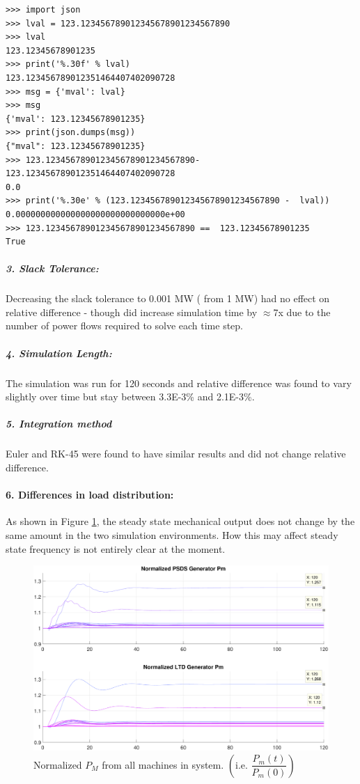 \documentclass[12pt]{article}
\begin{document}
\begin{lstlisting}
>>> import json
>>> lval = 123.123456789012345678901234567890
>>> lval
123.12345678901235
>>> print('%.30f' % lval)
123.123456789012351464407402090728
>>> msg = {'mval': lval}
>>> msg
{'mval': 123.12345678901235}
>>> print(json.dumps(msg))
{"mval": 123.12345678901235}
>>> 123.123456789012345678901234567890-123.123456789012351464407402090728
0.0
>>> print('%.30e' % (123.123456789012345678901234567890 -  lval))
0.000000000000000000000000000000e+00
>>> 123.123456789012345678901234567890 ==  123.12345678901235
True
\end{lstlisting}

\subparagraph{3. Slack Tolerance:}
Decreasing the slack tolerance to 0.001 MW ( from 1 MW) had no effect on relative difference - though did increase simulation time by $\approx$7x due to the number of power flows required to solve each time step.

\subparagraph{4. Simulation Length:}
The simulation was run for 120 seconds and relative difference was found to vary slightly over time but stay between 3.3E-3\% and 2.1E-3\%.
\subparagraph{5. Integration method} Euler and RK-45 were found to have similar results and did not change relative difference.

\pagebreak
\paragraph{6. Differences in load distribution:} As shown in Figure \ref{pmnorm}, the steady state mechanical output does not change by the same amount in the two simulation environments. How this may affect steady state frequency is not entirely clear at the moment.
	\begin{figure}[h!]
			\centering
			\includegraphics[width=\linewidth]{nomalizedPM}\vspace{-1em}
			\caption{Normalized $P_M$ from all machines in system. $\left( \text{i.e. }\dfrac{P_m(t)}{P_m(0)} \right)$}
			\label{pmnorm}		 
	\end{figure}\vspace{-.5em}
\end{document}
